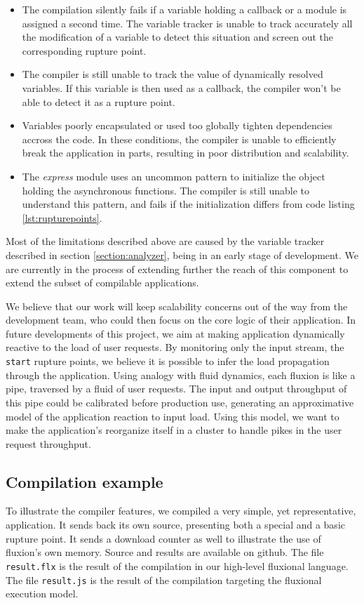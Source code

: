 \begin{itemize}
  \item The compilation silently fails if a variable holding a callback or a module is assigned a second time.
        The variable tracker is unable to track accurately all the modification of a variable to detect this situation and screen out the corresponding rupture point.
  \item The compiler is still unable to track the value of dynamically resolved variables.
        If this variable is then used as a callback, the compiler won't be able to detect it as a rupture point.
  \item Variables poorly encapsulated or used too globally tighten dependencies accross the code.
        In these conditions, the compiler is unable to efficiently break the application in parts, resulting in poor distribution and scalability.
  \item The \textit{express} module uses an uncommon pattern to initialize the object holding the asynchronous functions.
        The compiler is still unable to understand this pattern, and fails if the initialization differs from code listing \ref{lst:rupturepoints}.
\end{itemize}

Most of the limitations described above are caused by the variable tracker described in section \ref{section:analyzer}, being in an early stage of development.
We are currently in the process of extending further the reach of this component to extend the subset of compilable applications.

We believe that our work will keep scalability concerns out of the way from the development team, who could then focus on the core logic of their application.
In future developments of this project, we aim at making application dynamically reactive to the load of user requests.
By monitoring only the input stream, the \texttt{start} rupture points, we believe it is possible to infer the load propagation through the application.
Using analogy with fluid dynamics, each fluxion is like a pipe, traversed by a fluid of user requests.
The input and output throughput of this pipe could be calibrated before production use, generating an approximative model of the application reaction to input load.
Using this model, we want to make the application's reorganize itself in a cluster to handle pikes in the user request throughput.

\subsection{Compilation example}

To illustrate the compiler features, we compiled a very simple, yet representative, application.
It sends back its own source, presenting both a special and a basic rupture point.
It sends a download counter as well to illustrate the use of fluxion's own memory.
Source and results are available on github\cite{flx-example}.
The file \texttt{result.flx} is the result of the compilation in our high-level fluxional language.
The file \texttt{result.js} is the result of the compilation targeting the fluxional execution model.